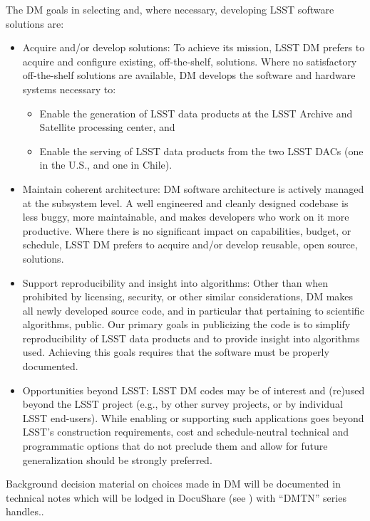 The DM goals in selecting and, where necessary, developing LSST software solutions are:

\begin{itemize}
	\item Acquire and/or develop solutions: To achieve its mission, LSST DM prefers to acquire and configure existing, off-the-shelf, solutions. Where no satisfactory off-the-shelf solutions are available, DM develops the software and hardware systems necessary to:
\begin{itemize}
	\item Enable the generation of LSST data products at the LSST Archive and Satellite processing center, and
	\item Enable the serving of LSST data products from the two LSST DACs (one in the U.S., and one in Chile).
\end{itemize}
	\item Maintain coherent architecture: DM software architecture is actively managed at the subsystem level. A well engineered and cleanly designed codebase is less buggy, more maintainable, and makes developers who work on it more productive. Where there is no significant impact on capabilities, budget, or schedule, LSST DM prefers to acquire and/or develop reusable, open source, solutions.
	\item Support reproducibility and insight into algorithms: Other than when prohibited by licensing, security, or other similar considerations, DM makes all newly developed source code, and in particular that pertaining to scientific algorithms,  public. Our primary goals in publicizing the code is to simplify reproducibility of LSST data products and to provide insight into algorithms used. Achieving this goals requires that the software must be properly documented.
	\item Opportunities beyond LSST: LSST DM codes may be of interest and (re)used beyond the LSST project (e.g., by other survey projects, or by individual LSST end-users). While enabling or supporting such applications goes beyond LSST’s construction requirements, cost and schedule-neutral technical and programmatic options that do not preclude them and allow for future generalization should be strongly preferred.


\end{itemize}

Background decision material on choices made in DM will be documented in technical notes which will be lodged in DocuShare (see ) with ``DMTN'' series handles..
